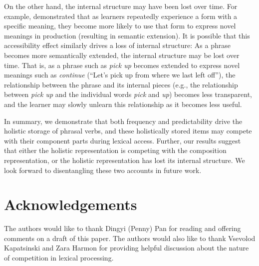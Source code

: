 \documentclass[
  authoryear,
  preprint,
  1p,
  onecolumn]{elsarticle}
\begin{document}
On the other hand, the internal structure may have been lost over time.
For example, \citet{harmonPuttingOldTools2017} demonstrated that as
learners repeatedly experience a form with a specific meaning, they
become more likely to use that form to express novel meanings in
production (resulting in semantic extension). It is possible that this
accessibility effect similarly drives a loss of internal structure: As a
phrase becomes more semantically extended, the internal structure may be
lost over time. That is, as a phrase such as \emph{pick up} becomes
extended to express novel meanings such as \emph{continue} (``Let's pick
up from where we last left off''), the relationship between the phrase
and its internal pieces (e.g., the relationship between \emph{pick up}
and the individual words \emph{pick} and \emph{up}) becomes less
transparent, and the learner may slowly unlearn this relationship as it
becomes less useful.

In summary, we demonstrate that both frequency and predictability drive
the holistic storage of phrasal verbs, and these holistically stored
items may compete with their component parts during lexical access.
Further, our results suggest that either the holistic representation is
competing with the composition representation, or the holistic
representation has lost its internal structure. We look forward to
disentangling these two accounts in future work.

\section{Acknowledgements}\label{acknowledgements}

The authors would like to thank Dingyi (Penny) Pan for reading and
offering comments on a draft of this paper. The authors would also like
to thank Vsevolod Kapatsinski and Zara Harmon for providing helpful
discussion about the nature of competition in lexical processing.

\newpage


  
\end{document}

